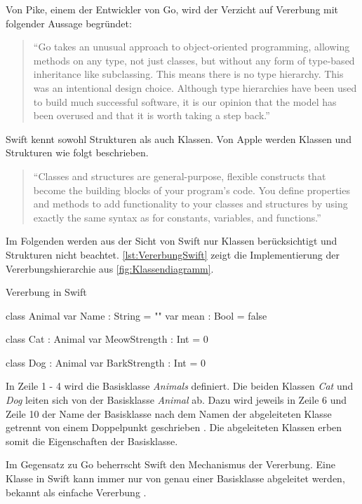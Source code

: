 Von Pike, einem der Entwickler von Go, wird der Verzicht auf Vererbung mit folgender Aussage begründet:
\begin{quote}
\enquote{Go takes an unusual approach to object-oriented programming, allowing methods on any type, not just classes, but without any form of type-based inheritance like subclassing. This means there is no type hierarchy. This was an intentional design choice. Although type hierarchies have been used to build much successful software, it is our opinion that the model has been overused and that it is worth taking a step back.}\cite[]{RobPike.2012}
\end{quote}

Swift kennt sowohl Strukturen als auch Klassen. Von Apple werden Klassen und Strukturen wie folgt beschrieben. 
\begin{quote}
\enquote{Classes and structures are general-purpose, flexible constructs that become the building blocks of your program’s code. You define properties and methods to add functionality to your classes and
structures by using exactly the same syntax as for constants, variables, and functions.} \cite[S.183]{Apple.2017}
\end{quote}

Im Folgenden werden aus der Sicht von Swift nur Klassen berücksichtigt und Strukturen nicht beachtet.
\autoref{lst:VererbungSwift} zeigt die Implementierung der Vererbungshierarchie aus \autoref{fig:Klassendiagramm}.

\begin{listing}[H]
\caption{Vererbung in Swift}
\label{lst:VererbungSwift}
\begin{SwiftCode}
class Animal{
    var Name : String = ""
    var mean : Bool = false
}

class Cat : Animal{
    var MeowStrength : Int = 0
}

class Dog : Animal{
    var BarkStrength : Int = 0
}
\end{SwiftCode}
\end{listing}

In Zeile 1 - 4 wird die Basisklasse \emph{Animals} definiert. 
Die beiden Klassen \textit{Cat} und \textit{Dog} leiten sich von der Basisklasse \textit{Animal} ab. 
Dazu wird jeweils in Zeile 6 und Zeile 10 der Name der Basisklasse nach dem Namen der abgeleiteten Klasse getrennt von einem Doppelpunkt geschrieben \cite[S.226]{Apple.2017}.
Die abgeleiteten Klassen erben somit die Eigenschaften der Basisklasse. 

Im Gegensatz zu Go beherrscht Swift den Mechanismus der Vererbung.
Eine Klasse in Swift kann immer nur von genau einer Basisklasse abgeleitet werden, bekannt als einfache Vererbung \cite[S.125]{Hoffman.2017}.

